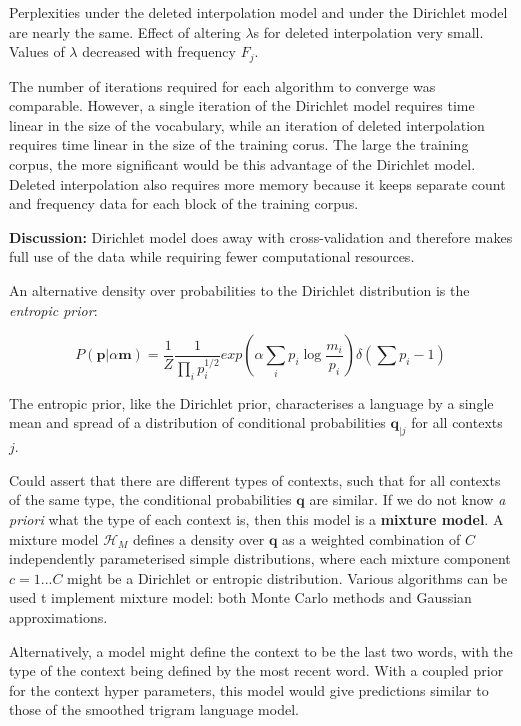 \noindent Perplexities under the deleted interpolation model and under the Dirichlet model are nearly the same. Effect of altering $\lambda$s for deleted interpolation very small. Values of $\lambda$ decreased with frequency $F_{j}$.

The number of iterations required for each algorithm to converge was comparable. However, a single iteration of the Dirichlet model requires time linear in the size of the vocabulary, while an iteration of deleted interpolation requires time linear in the size of the training corus. The large the training corpus, the more significant would be this advantage of the Dirichlet model. Deleted interpolation also requires more memory because it keeps separate count and frequency data for each block of the training corpus. 

\textbf{Discussion: }Dirichlet model does away with cross-validation and therefore makes full use of the data while requiring fewer computational resources.

An alternative density over probabilities to the Dirichlet distribution is the \textit{entropic prior}:

\begin{equation}
P(\boldsymbol{p}|\alpha\boldsymbol{m})=\frac{1}{Z}\frac{1}{\prod_{i}p_{i}^{1/2}}exp\left(\alpha\sum_{i}p_{i}\log\frac{m_{i}}{p_{i}}\right)\delta\left(\sum p_{i}-1\right)
\end{equation}

\noindent The entropic prior, like the Dirichlet prior, characterises a language by a single mean and spread of a distribution of conditional probabilities $\boldsymbol{q}_{|j}$ for all contexts $j$.

Could assert that there are different types of contexts, such that for all contexts of the same type, the conditional probabilities $\boldsymbol{q}$ are similar. If we do not know \textit{a priori} what the type of each context is, then this model is a \textbf{mixture model}. A mixture model $\mathscr{H}_{M}$ defines a density over $\boldsymbol{q}$ as a weighted combination of $C$ independently parameterised simple distributions, where each mixture component $c=1...C$ might be a Dirichlet or entropic distribution. Various algorithms can be used t implement mixture model: both Monte Carlo methods and Gaussian approximations. 

Alternatively, a model might define the context to be the last two words, with the type of the context being defined by the most recent word. With a coupled prior for the context hyper parameters, this model would give predictions similar to those of the smoothed trigram language model. 

